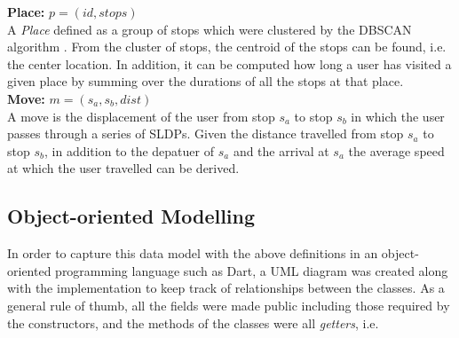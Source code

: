 \textbf{Place:} $p = (id, stops)$\\
A \textit{Place} defined as a group of stops which were clustered by the DBSCAN algorithm \cite{density-based-1996}. From the cluster of stops, the centroid of the stops can be found, i.e. the center location. In addition, it can be computed how long a user has visited a given place by summing over the durations of all the stops at that place.\\

\textbf{Move:} $m = (s_a, s_b, dist)$\\
A move is the displacement of the user from stop $s_a$ to stop $s_b$ in which the user passes through a series of SLDPs. Given the distance travelled from stop $s_a$ to stop $s_b$, in addition to the depatuer of $s_a$ and the arrival at $s_a$ the average speed at which the user travelled can be derived. 


\subsection{Object-oriented Modelling}
In order to capture this data model with the above definitions in an object-oriented programming language such as Dart, a UML diagram was created along with the implementation to keep track of relationships between the classes. As a general rule of thumb, all the fields were made public including those required by the constructors, and the methods of the classes were all \textit{getters}, i.e. 

